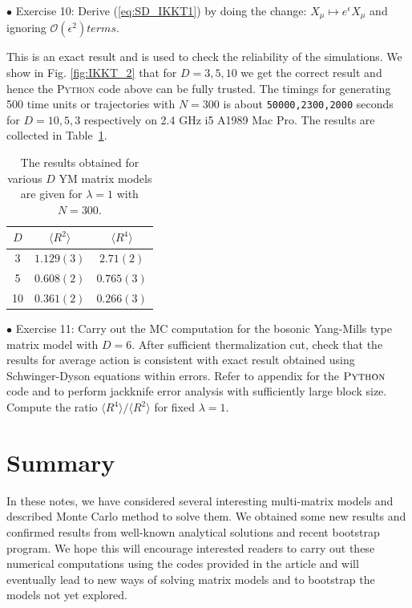 \documentclass[11pt]{article}
\newcommand{\PY}{\textsc{Python }}
\begin{document}
\begin{mdframed}[backgroundcolor=blue!3] 
	\textsc{} 
	$\bullet$ Exercise 10: Derive (\ref{eq:SD_IKKT1}) by doing the change: $X_{\mu} \mapsto e^{\epsilon}X_{\mu}$ and ignoring 
	$\mathcal{O}(\epsilon^{2}) terms.$
\end{mdframed}

This is an exact result and is used to check the reliability of the simulations. 
We show in Fig. \ref{fig:IKKT_2} that for $D=3,5,10$ we get the correct result and 
hence the \PY code above can be fully trusted. The timings for generating 500 time units or trajectories 
with $N=300$ is about \texttt{50000,2300,2000} seconds for $D = 10, 5, 3$ respectively on 2.4 GHz i5 A1989 Mac Pro. 
The results are collected in Table~\ref{table:D_IKKT_data}. 
\begin{table}[h!]
	\centering
	\begin{tabular}{||c c c||} 
		\hline
		$D$ & $ \langle R^2 \rangle$ & $ \langle R^4 \rangle$ \\ [0.5ex] 
		\hline\hline
		3 & $1.129(3) $ & $2.71(2) $  \\ 
		5 & $0.608(2) $ & $0.765(3) $  \\
		10 & $0.361(2)$ & $0.266(3)$
		 \\ [1ex] 
		\hline 
	\end{tabular}
\caption{The results obtained for various $D$ YM matrix models are given for $\lambda=1$ with $N=300$.}
\label{table:D_IKKT_data}
\end{table}

\begin{mdframed}[backgroundcolor=blue!3] 
	\textsc{} 
	$\bullet$ Exercise 11: Carry out the MC computation for the bosonic Yang-Mills type matrix model with $D=6$. After sufficient thermalization cut, check that the results for average action is consistent with exact result obtained using Schwinger-Dyson equations within errors. Refer to appendix for the $\textsc{Python}$ code and to perform jackknife error analysis with sufficiently large block size. Compute the ratio $\langle R^4 \rangle / \langle R^2 \rangle$ for fixed $\lambda=1$. 
\end{mdframed} 


\section{Summary}
In these notes, we have considered several interesting multi-matrix models and 
described Monte Carlo method to solve them. We obtained some new 
results and confirmed results from well-known analytical solutions and recent 
bootstrap program. We hope this will encourage interested readers 
to carry out these numerical computations using the codes provided in the article 
and will eventually lead to new ways of solving matrix models and to 
bootstrap the models not yet explored. 
\end{document}
